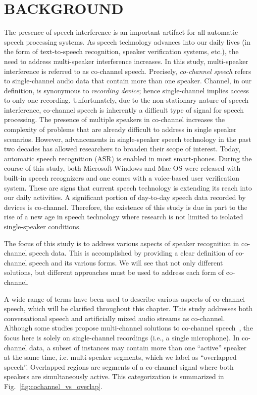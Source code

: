 
\chapter{BACKGROUND}
\label{chap:intro}
 
The presence of speech interference is an important artifact for all automatic speech processing systems. 
As speech technology advances into our daily lives (in the form of text-to-speech recognition, speaker verification systems, etc.), the need to address multi-speaker interference increases. 
In this study, multi-speaker interference is referred to as co-channel speech. 
Precisely, {\it co-channel speech} refers to single-channel audio data that contain more than one speaker. 
Channel, in our definition, is synonymous to {\it recording device}; hence single-channel implies access to only one recording. 
Unfortunately, due to the non-stationary nature of speech interference, co-channel speech is inherently a difficult type of signal for speech processing. 
The presence of multiple speakers in co-channel increases the complexity of problems that are already difficult to address in single speaker scenarios. 
However, advancements in single-speaker speech technology in the past two decades has allowed researchers to broaden their scope of interest. 
Today, automatic speech recognition (ASR) is enabled in most smart-phones. 
During the course of this study, both Microsoft Windows and Mac OS were released with built-in speech recognizers and one comes with a voice-based user verification system. 
These are signs that current speech technology is extending its reach into our daily activities. 
A significant portion of day-to-day speech data recorded by devices is co-channel. 
Therefore, the existence of this study is due in part to the rise of a new age in speech technology where research is not limited to isolated single-speaker conditions. 

The focus of this study is to address various aspects of speaker recognition in co-channel speech data. 
This is accomplished by providing a clear definition of co-channel speech and its various forms. 
We will see that not only different solutions, but different approaches must be used to address each form of co-channel. 





A wide range of terms have been used to describe various aspects of co-channel speech, 
which will be clarified throughout this chapter. 
This study addresses both conversational speech and artificially mixed audio streams as co-channel. 
Although some studies propose multi-channel solutions to co-channel speech~\cite{panahi2009blind,xiao2011overlapped}, the focus here is solely on single-channel recordings (i.e., a single microphone). 
In co-channel data, a subset of instances may contain more than one ``active'' speaker at the same time, i.e. multi-speaker segments, 
which we label as ``overlapped speech''. 
Overlapped regions are segments of a co-channel signal where both speakers are simultaneously active. This categorization is summarized in Fig.~\ref{fig:cochannel_vs_overlap}.


